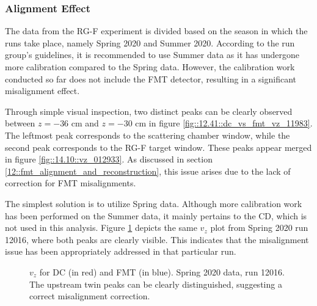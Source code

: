 \subsubsection{Alignment Effect}
\label{14.11::alignment_effect}
    The data from the RG-F experiment is divided based on the season in which the runs take place, namely Spring 2020 and Summer 2020.
    According to the run group's guidelines, it is recommended to use Summer data as it has undergone more calibration compared to the Spring data.
    However, the calibration work conducted so far does not include the FMT detector, resulting in a significant misalignment effect.

    Through simple visual inspection, two distinct peaks can be clearly observed between $z = -36$ cm and $z = -30$ cm in figure \ref{fig::12.41::dc_vs_fmt_vz_11983}.
    The leftmost peak corresponds to the scattering chamber window, while the second peak corresponds to the RG-F target window.
    These peaks appear merged in figure \ref{fig::14.10::vz_012933}.
    As discussed in section \ref{12::fmt_alignment_and_reconstruction}, this issue arises due to the lack of correction for FMT misalignments.

    The simplest solution is to utilize Spring data.
    Although more calibration work has been performed on the Summer data, it mainly pertains to the CD, which is not used in this analysis.
    Figure \ref{fig::14.11::vz_012016} depicts the same $v_z$ plot from Spring 2020 run 12016, where both peaks are clearly visible.
    This indicates that the misalignment issue has been appropriately addressed in that particular run.

    \begin{figure}[t!]
        \centering{}
        \caption[$v_z$ for DC and FMT, run 12016]{$v_z$ for DC (in red) and FMT (in blue). Spring 2020 data, run 12016. The upstream twin peaks can be clearly distinguished, suggesting a correct misalignment correction.}
        \label{fig::14.11::vz_012016}
    \end{figure}
